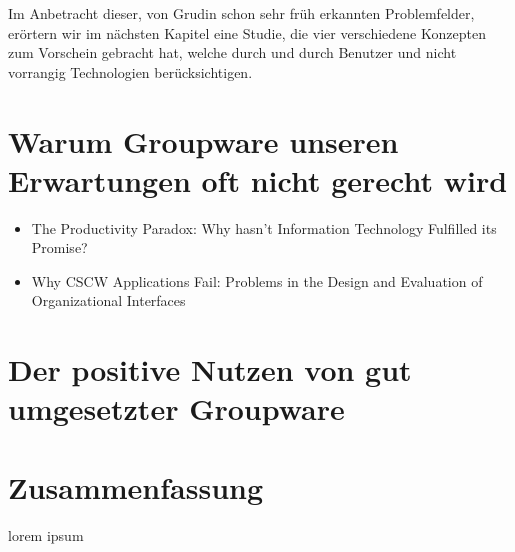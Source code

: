 \medskip Im Anbetracht dieser, von Grudin schon sehr früh erkannten Problemfelder, erörtern wir im nächsten Kapitel eine Studie, die vier verschiedene Konzepten zum Vorschein gebracht hat, welche durch und durch Benutzer und nicht vorrangig Technologien berücksichtigen.

\section{Warum Groupware unseren Erwartungen oft nicht gerecht wird}
\begin{itemize}
	\item {The Productivity Paradox: Why hasn't Information Technology Fulfilled its Promise?}
	\item {Why CSCW Applications Fail: Problems in the Design and Evaluation of Organizational Interfaces}
\end{itemize}

\section{Der positive Nutzen von gut umgesetzter Groupware}

\section*{Zusammenfassung}
lorem ipsum
